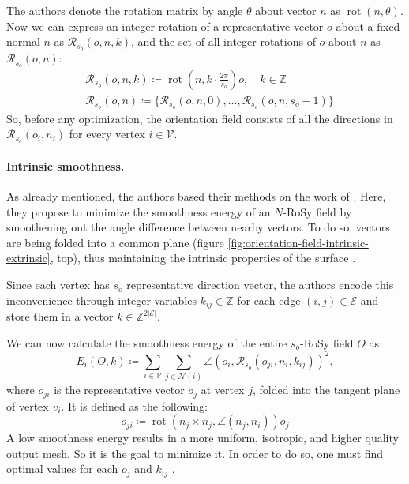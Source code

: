 \documentclass{ACGSeminar}
\DeclareMathOperator{\rot}{rot}
\begin{document}
The authors denote the rotation matrix by angle $\theta$ about vector $n$ as $\rot(n, \theta)$. Now we can express an integer rotation of a representative vector $o$ about a fixed normal $n$ as $\mathcal{R}_{s_o}(o,n,k)$, and the set of all integer rotations of $o$ about $n$ as $\mathcal{R}_{s_o}(o,n)$:
\begin{equation*}
\begin{split}
	& \mathcal{R}_{s_o}(o,n,k) \coloneqq \rot(n, k \cdot \frac{2\pi}{s_o})o, \quad k \in \mathbb{Z} \\
	& \mathcal{R}_{s_o}(o,n) \coloneqq \{\mathcal{R}_{s_o}(o,n,0), \dots, \mathcal{R}_{s_o}(o,n,s_o-1)\}
\end{split}
\end{equation*}
So, before any optimization, the orientation field consists of all the directions in $\mathcal{R}_{s_o}(o_i, n_i)$ for every vertex $i \in \mathcal{V}$.

\paragraph{Intrinsic smoothness.}
As already mentioned, the authors based their methods on the work of \cite{ray2008n,bommes2009mixed}. Here, they propose to minimize the smoothness energy of an $N$-RoSy field by smoothening out the angle difference between nearby vectors. To do so, vectors are being folded into a common plane (figure \ref{fig:orientation-field-intrinsic-extrinsic}, top), thus maintaining the intrinsic properties of the surface \cite{jakob2015instant}.\bigskip

Since each vertex has $s_o$ representative direction vector, the authors encode this inconvenience through integer variables $k_{ij} \in \mathbb{Z}$ for each edge $(i,j) \in \mathcal{E}$ and store them in a vector $k \in \mathbb{Z}^{2 \vert \mathcal{E} \vert}$.

We can now calculate the smoothness energy of the entire $s_o$-RoSy field $O$ as:
\begin{equation}\label{eq:orientation-isotropic-energy}
	E_i(O,k) \coloneqq \sum_{i \in \mathcal{V}} \sum_{j \in \mathcal{N}(i)} \angle(o_i, \mathcal{R}_{s_o}(o_{ji}, n_i, k_{ij}))^2,
\end{equation}
where $o_{ji}$ is the representative vector $o_j$ at vertex $j$, folded into the tangent plane of vertex $v_i$. It is defined as the following:
\begin{equation*}
	o_{ji} \coloneqq \rot(n_j \times n_j, \angle(n_j, n_i))o_j
\end{equation*}
A low smoothness energy results in a more uniform, isotropic, and higher quality output mesh. So it is the goal to minimize it. In order to do so, one must find optimal values for each $o_j$ and $k_{ij}$ \cite{jakob2015instant}.\bigskip
\end{document}
